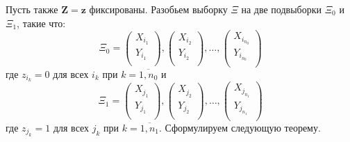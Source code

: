 Пусть также $\mathbf{Z}=\mathbf{z}$ фиксированы. Разобьем выборку $\Xi$ на две подвыборки $\Xi_0$ и $\Xi_1$, такие что:
$$
\Xi_0=
\begin{pmatrix}
    X_{i_1} \\
    Y_{i_1} \\
\end{pmatrix},
\begin{pmatrix}
    X_{i_2} \\
    Y_{i_2} \\
\end{pmatrix}, \ldots,
\begin{pmatrix}
    X_{i_{n_0}} \\
    Y_{i_{n_0}} \\
\end{pmatrix} 
$$
где $z_{i_k}=0$ для всех $i_k$ при $k=\overline{1,n_0}$ и $$
\Xi_1=
\begin{pmatrix}
    X_{j_1} \\
    Y_{j_1} \\
\end{pmatrix},
\begin{pmatrix}
    X_{j_2} \\
    Y_{j_2} \\
\end{pmatrix}, \ldots,
\begin{pmatrix}
    X_{j_{n_1}} \\
    Y_{j_{n_1}} \\
\end{pmatrix} 
$$
где $z_{j_k}=1$ для всех $j_k$ при $k=\overline{1,n_1}$. Сформулируем следующую теорему.

